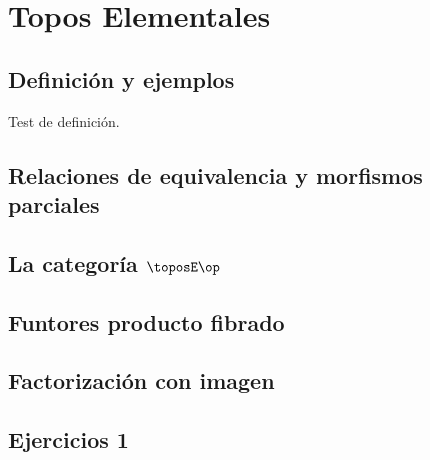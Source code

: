 \chapter{Topos Elementales}
\label{cap:1}

\section{Definición y ejemplos}
\label{sec:definicion_ejemplos}

\begin{definition}
  Test de definición.
\end{definition}

\section{Relaciones de equivalencia y morfismos parciales}
\label{sec:relaciones_equivalencia_morfismos_parciales}

\section{La categoría \(\toposE\op\)}
\label{sec:categoria_Eop}

\section{Funtores producto fibrado}
\label{sec:funtores_producto_fibrado}

\section{Factorización con imagen}
\label{sec:factorizacion_imagen}

\section*{Ejercicios 1}
\label{sec:ejercicios-1}
